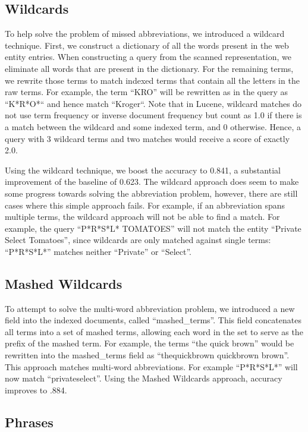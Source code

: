 \documentclass[11pt,a4paper]{article}
\begin{document}
\subsection{Wildcards}

To help solve the problem of missed abbreviations, we introduced a
wildcard technique.  First, we construct a dictionary of all the words
present in the web entity entries.  When constructing a query from the
scanned representation, we eliminate all words that are present in the
dictionary.  For the remaining terms, we rewrite those terms to match
indexed terms that contain all the letters in the raw terms.  For
example, the term ``KRO'' will be rewritten as in the query as
``K*R*O*`` and hence match ``Kroger``.  Note that in Lucene, wildcard
matches do not use term frequency or inverse document frequency but
count as 1.0 if there is a match between the wildcard and some indexed
term, and 0 otherwise.  Hence, a query with 3 wildcard terms and two
matches would receive a score of exactly 2.0.

Using the wildcard technique, we boost the accuracy to 0.841, a
substantial improvement of the baseline of 0.623.  The wildcard
approach does seem to make some progress towards solving the
abbreviation problem, however, there are still cases where this simple
approach fails.  For example, if an abbreviation spans multiple terms,
the wildcard approach will not be able to find a match.  For example,
the query ``P*R*S*L* TOMATOES'' will not match the entity ``Private
Select Tomatoes'', since wildcards are only matched against single
terms: ``P*R*S*L*'' matches neither ``Private'' or ``Select''.

\subsection{Mashed Wildcards}

To attempt to solve the multi-word abbreviation problem, we introduced
a new field into the indexed documents, called ``mashed\_terms''.  This
field concatenates all terms into a set of mashed
terms, allowing each word in the set to serve as the prefix of the
mashed term.  For example, the terms ``the quick brown'' would
be rewritten into the mashed\_terms field as ``thequickbrown quickbrown
brown''.  This approach matches multi-word abbreviations.  For example
``P*R*S*L*'' will now match ``privateselect''.  Using the Mashed
Wildcards approach, accuracy improves to .884. 

\subsection{Phrases}
\end{document}
